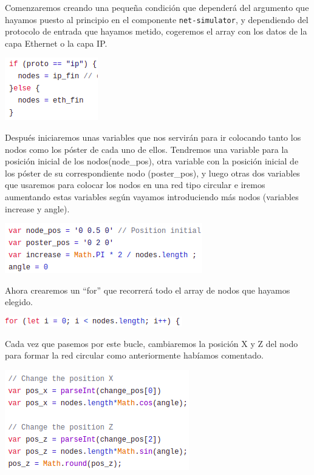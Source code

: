 \documentclass[a4paper, 12pt]{book}
\begin{document}
Comenzaremos creando una pequeña condición que dependerá del argumento que hayamos puesto al principio en el componente \texttt{net-simulator}, y dependiendo del protocolo de entrada que hayamos metido, cogeremos el array con los datos de la capa Ethernet o la capa IP.


\begin{center}
    \includegraphics[scale=0.7]{img/condproto_comp_netsim.png}
\end{center}

Después iniciaremos unas variables que nos servirán para ir colocando tanto los nodos como los póster de cada uno de ellos. Tendremos una variable para la posición inicial de los nodos(node\_pos), otra variable con la posición inicial de los póster de su correspondiente nodo (poster\_pos), y luego otras dos variables que usaremos para colocar los nodos en una red tipo circular e iremos aumentando estas variables según vayamos introduciendo más nodos (variables increase y angle).

\begin{center}
    \includegraphics[scale=0.7]{img/varini_comp_netsim.png}
\end{center}


Ahora crearemos un “for” que recorrerá todo el array de nodos que hayamos elegido.

\begin{center}
    \includegraphics[scale=0.7]{img/fornode_comp_netsim.png}
\end{center}

Cada vez que pasemos por este bucle, cambiaremos la posición X y Z del nodo para formar la red circular como anteriormente habíamos comentado.

\begin{center}
    \includegraphics[scale=0.7]{img/posXZ_comp_netsim.png}
\end{center}
\end{document}
